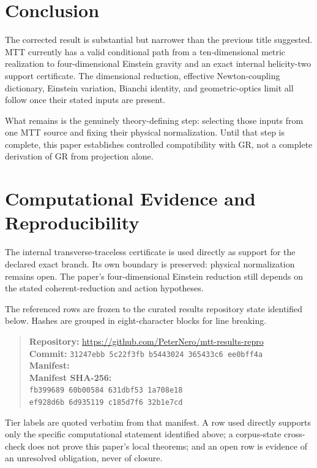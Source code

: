 \documentclass[11pt,a4paper]{article}
\theoremstyle{definition}
\theoremstyle{remark}
\begin{document}
\section{Conclusion}

The corrected result is substantial but narrower than the previous title
suggested.  MTT currently has a valid conditional path from a
ten-dimensional metric realization to four-dimensional Einstein gravity and
an exact internal helicity-two support certificate.  The dimensional
reduction, effective Newton-coupling dictionary, Einstein variation, Bianchi
identity, and geometric-optics limit all follow once their stated inputs are
present.

What remains is the genuinely theory-defining step: selecting those inputs
from one MTT source and fixing their physical normalization.  Until that step
is complete, this paper establishes controlled compatibility with GR, not a
complete derivation of GR from projection alone.

\section*{Computational Evidence and Reproducibility}
The internal transverse-traceless certificate is used directly as support for the declared exact branch. Its own boundary is preserved: physical normalization remains open. The paper's four-dimensional Einstein reduction still depends on the stated coherent-reduction and action hypotheses.

The referenced rows are frozen to the curated results repository state identified below. Hashes are grouped in eight-character blocks for line breaking.
\begin{quote}\small
\textbf{Repository:} \url{https://github.com/PeterNero/mtt-results-repro}\\
\textbf{Commit:} \texttt{31247ebb 5c22f3fb b5443024 365433c6 ee0bff4a}\\
\textbf{Manifest:} \\
\textbf{Manifest SHA-256:}\\
\texttt{fb399689 60b00584 631dbf53 1a708e18}\\
\texttt{ef928d6b 6d935119 c185d7f6 32b1e7cd}
\end{quote}

Tier labels are quoted verbatim from that manifest. A row used directly supports only the specific computational statement identified above; a corpus-state cross-check does not prove this paper's local theorems; and an open row is evidence of an unresolved obligation, never of closure.
\end{document}
